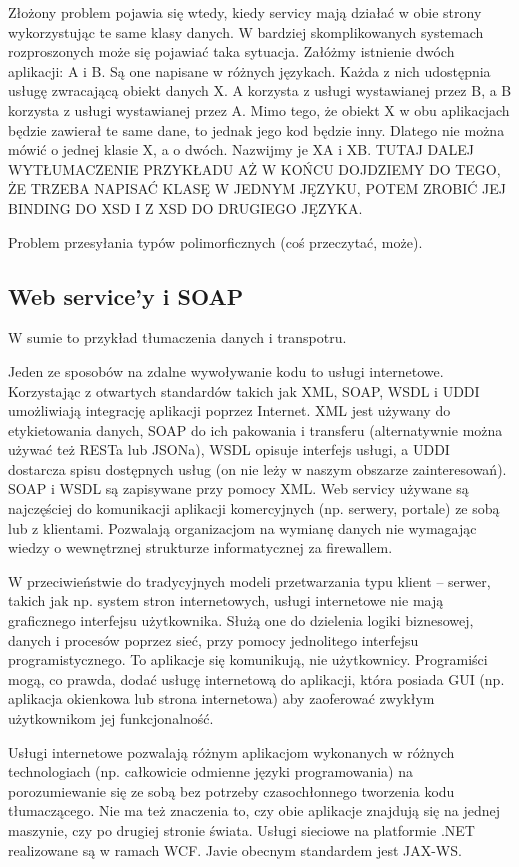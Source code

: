 Złożony problem pojawia się wtedy, kiedy servicy mają działać w obie strony wykorzystując te same klasy danych. W bardziej skomplikowanych systemach rozproszonych może się pojawiać taka sytuacja. Załóżmy istnienie dwóch aplikacji: A i B. Są one napisane w różnych językach. Każda z nich udostępnia usługę zwracającą obiekt danych X. A korzysta z usługi wystawianej przez B, a B korzysta z usługi wystawianej przez A. Mimo tego, że obiekt X w obu aplikacjach będzie zawierał te same dane, to jednak jego kod będzie inny. Dlatego nie można mówić o jednej klasie X, a o dwóch. Nazwijmy je XA i XB. TUTAJ DALEJ WYTŁUMACZENIE PRZYKŁADU AŻ W KOŃCU DOJDZIEMY DO TEGO, ŻE TRZEBA NAPISAĆ KLASĘ W JEDNYM JĘZYKU, POTEM ZROBIĆ JEJ BINDING DO XSD I Z XSD DO DRUGIEGO JĘZYKA.

Problem przesyłania typów polimorficznych (coś przeczytać, może). 

\subsection{Web service'y i SOAP}
W sumie to przykład tłumaczenia danych  i transpotru.

Jeden ze sposobów na zdalne wywoływanie kodu to usługi internetowe. Korzystając z otwartych standardów takich jak XML, SOAP, WSDL i UDDI umożliwiają integrację aplikacji poprzez Internet. XML jest używany do etykietowania danych, SOAP do ich pakowania i transferu (alternatywnie można używać też RESTa lub JSONa), WSDL opisuje interfejs usługi, a UDDI dostarcza spisu dostępnych usług (on nie leży w naszym obszarze zainteresowań). SOAP i WSDL są zapisywane przy pomocy XML. Web servicy używane są najczęściej do komunikacji aplikacji komercyjnych (np. serwery, portale) ze sobą lub z klientami. Pozwalają organizacjom na wymianę danych nie wymagając wiedzy o wewnętrznej strukturze informatycznej za firewallem.

W przeciwieństwie do tradycyjnych modeli przetwarzania typu klient – serwer, takich jak np. system stron internetowych, usługi internetowe nie mają graficznego interfejsu użytkownika. Służą one do dzielenia logiki biznesowej, danych i procesów poprzez sieć, przy pomocy jednolitego interfejsu programistycznego. To aplikacje się komunikują, nie użytkownicy. Programiści mogą, co prawda, dodać usługę internetową do aplikacji, która posiada GUI (np. aplikacja okienkowa lub strona internetowa) aby zaoferować zwykłym użytkownikom jej funkcjonalność.

Usługi internetowe pozwalają różnym aplikacjom wykonanych w różnych technologiach (np. całkowicie odmienne języki programowania) na porozumiewanie się ze sobą bez potrzeby czasochłonnego tworzenia kodu tłumaczącego. Nie ma też znaczenia to, czy obie aplikacje znajdują się na jednej maszynie, czy po drugiej stronie świata.
Usługi sieciowe na platformie .NET realizowane są w ramach WCF. Javie obecnym standardem jest JAX-WS.

